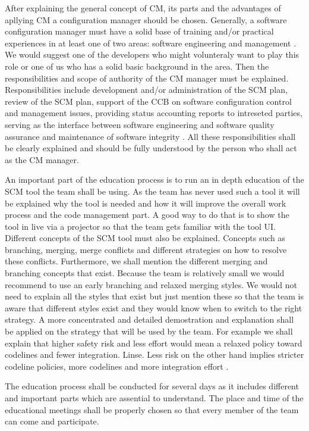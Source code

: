\documentclass[a4paper]{article}
\begin{document}
After explaining the general concept of CM, its parts and the advantages of apllying CM a configuration manager should be chosen. Generally, a software configuration manager must have a solid base of training and/or practical experiences in at least one of two areas: software engineering and management \cite{compton}.  We would suggest one of the developers who might volunteraly want to play this role or one of us who has a solid basic background in the area. Then the responsibilities and scope of authority of the CM manager must be explained. Responsibilities include development and/or administration of the SCM plan, review of the SCM plan, support of the CCB on software configuration control and management issues, providing status accounting reports to intreseted parties, serving as the interface between software engineering and software quality assurance and maintenance of software integrity \cite{compton}. All these responsibilities shall be clearly explained and should be fully understood by the person who shall act as the CM manager. 

An important part of the education process is to run an in depth education of the SCM tool the team shall be using. As the team has never used such a tool it will be explained why the tool is needed and how it will improve the overall work process and the code management part. A good way to do that is to show the tool in live via a projector so that the team gets familiar with the tool UI. Different concepts of the SCM tool must also be explained. Concepts such as branching, merging, merge conflicts and different strategies on how to resolve these conflicts. Furthermore, we shall mention the different merging and branching concepts that exist. Because the team is relatively small we would recommend to use an early branching and relaxed merging styles. We would not need to explain all the styles that exist but just mention these so that the team is aware that different styles exist and they would know when to switch to the right strategy. A more concentrated and detailed demostration and explanation shall be applied on the strategy that will be used by the team. For example we shall explain that higher safety risk and less effort would mean a relaxed policy toward codelines and fewer integration. Linse. Less risk on the other hand implies stricter codeline policies, more codelines and more integration effort \cite{mikkelsen-pherigo}.

The education process shall be conducted for several days as it includes different and important parts which are assential to understand. The place and time of the educational meetings shall be properly chosen so that every member of the team can come and participate.
\end{document}
